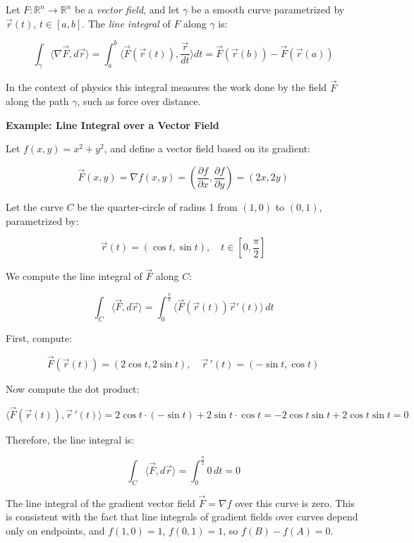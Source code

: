 Let \( F : \mathbb{R}^n \to \mathbb{R}^n \) be a \emph{vector field}, and let \( \gamma \) be a smooth curve parametrized by \( \vec{r}(t) \), \( t \in [a, b] \). 
The \emph{line integral} of \( F \) along \( \gamma \) is:

\[
\int_\gamma \langle \nabla \vec{F}, d\vec{r} \rangle = \int_a^b \langle \vec{F}(\vec{r}(t)), \frac{\vec{r}}{dt} \rangle dt = \vec{F}(\vec{r}(b)) - \vec{F}(\vec{r}(a))
\]

In the context of physics this integral measures the work done by the field \( \vec{F} \) along the path \( \gamma \), such as force over distance.
\vspace{\baselineskip}

\textbf{Example: Line Integral over a Vector Field}
\vspace{\baselineskip}

Let \( f(x, y) = x^2 + y^2 \), and define a vector field based on its gradient:

\[
\vec{F}(x, y) = \nabla f(x, y) = \left( \frac{\partial f}{\partial x}, \frac{\partial f}{\partial y} \right) = (2x, 2y)
\]

Let the curve \( C \) be the quarter-circle of radius 1 from \( (1, 0) \) to \( (0, 1) \), 
parametrized by:

\[
\vec{r}(t) = (\cos t, \sin t), \quad t \in \left[0, \frac{\pi}{2}\right]
\]

We compute the line integral of \( \vec{F} \) along \( C \):

\[
\int_C \langle \vec{F}, d\vec{r}\rangle = \int_0^{\frac{\pi}{2}} \langle\vec{F}(\vec{r}(t)) \vec{r}'(t) \rangle\, dt
\]

First, compute:

\[
\vec{F}(\vec{r}(t)) = (2\cos t, 2\sin t), \quad \vec{r}\,'(t) = (-\sin t, \cos t)
\]

Now compute the dot product:

\[
\langle\vec{F}(\vec{r}(t)), \vec{r}\,'(t)\rangle = 2\cos t \cdot (-\sin t) + 2\sin t \cdot \cos t = -2\cos t \sin t + 2\cos t \sin t = 0
\]

Therefore, the line integral is:

\[
\int_C \langle \vec{F}, d\vec{r}\rangle = \int_0^{\frac{\pi}{2}} 0 \, dt = 0
\]

The line integral of the gradient vector field \( \vec{F} = \nabla f \) over this curve is zero. 
This is consistent with the fact that line integrals of gradient fields over 
curves depend only on endpoints, and  \(f(1,0) = 1 \), \(f(0,1) = 1 \), so \( f(B) - f(A) = 0 \).


